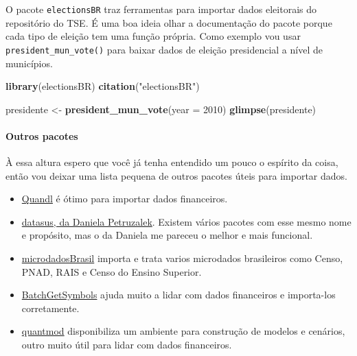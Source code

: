 \documentclass[
]{article}
\newenvironment{Shaded}{\begin{snugshade}}{\end{snugshade}}
\newcommand{\DataTypeTok}[1]{\textcolor[rgb]{0.13,0.29,0.53}{#1}}
\newcommand{\DecValTok}[1]{\textcolor[rgb]{0.00,0.00,0.81}{#1}}
\newcommand{\KeywordTok}[1]{\textcolor[rgb]{0.13,0.29,0.53}{\textbf{#1}}}
\newcommand{\NormalTok}[1]{#1}
\newcommand{\StringTok}[1]{\textcolor[rgb]{0.31,0.60,0.02}{#1}}
\providecommand{\tightlist}{%
  \setlength{\itemsep}{0pt}\setlength{\parskip}{0pt}}
\begin{document}
O pacote \texttt{electionsBR} traz ferramentas para importar dados
eleitorais do repositório do TSE. É uma boa ideia olhar a documentação
do pacote porque cada tipo de eleição tem uma função própria. Como
exemplo vou usar \texttt{president\_mun\_vote()} para baixar dados de
eleição presidencial a nível de municípios.

\begin{Shaded}
\begin{Highlighting}[]
\KeywordTok{library}\NormalTok{(electionsBR)}
\KeywordTok{citation}\NormalTok{(}\StringTok{"electionsBR"}\NormalTok{)}

\NormalTok{presidente <-}\StringTok{ }\KeywordTok{president_mun_vote}\NormalTok{(}\DataTypeTok{year =} \DecValTok{2010}\NormalTok{)}
\KeywordTok{glimpse}\NormalTok{(presidente)}
\end{Highlighting}
\end{Shaded}

\hypertarget{outros-pacotes}{%
\paragraph{Outros pacotes}\label{outros-pacotes}}

À essa altura espero que você já tenha entendido um pouco o espírito da
coisa, então vou deixar uma lista pequena de outros pacotes úteis para
importar dados.

\begin{itemize}
\tightlist
\item
  \href{https://www.quandl.com/tools/r}{Quandl} é ótimo para importar
  dados financeiros.
\item
  \href{https://github.com/danicat/datasus}{datasus, da Daniela
  Petruzalek}. Existem vários pacotes com esse mesmo nome e propósito,
  mas o da Daniela me pareceu o melhor e mais funcional.
\item
  \href{https://github.com/lucasmation/microdadosBrasil}{microdadosBrasil}
  importa e trata varios microdados brasileiros como Censo, PNAD, RAIS e
  Censo do Ensino Superior.
\item
  \href{https://cran.r-project.org/web/packages/BatchGetSymbols/BatchGetSymbols.pdf}{BatchGetSymbols}
  ajuda muito a lidar com dados financeiros e importa-los corretamente.
\item
  \href{https://www.quantmod.com/}{quantmod} disponibiliza um ambiente
  para construção de modelos e cenários, outro muito útil para lidar com
  dados financeiros.
\end{itemize}
\end{document}
